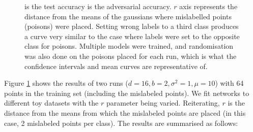 \documentclass{ociamthesis}
\begin{document}
\begin{figure}[!h]
    \centering
    \qquad
    \caption{ is the
    test accuracy  is the
    adversarial accuracy. $r$ axis represents the distance from the means of the
    gaussians where mislabelled points (poisons) were placed. Setting wrong
    labels to a third class produces a curve very similar to the case where
    labels were set to the opposite class for poisons. Multiple models were
    trained, and randomisation was also done on the poisons placed for each run,
    which is what the confidence intervals and mean curves are representative
    of.}
    \label{fig:far-gaussian-curve}
\end{figure}

Figure \ref{fig:far-gaussian-curve} shows the results of two runs ($d=16, b=2,
\sigma^2=1, \mu=10$) with 64 points in the training set (including the
mislabeled points). We fit networks to different toy datasets with the $r$
parameter being varied. Reiterating, $r$ is the distance from the means from
which the mislabeled points are placed (in this case, 2 mislabeled points per
class). The results are summarised as follows:
\end{document}
